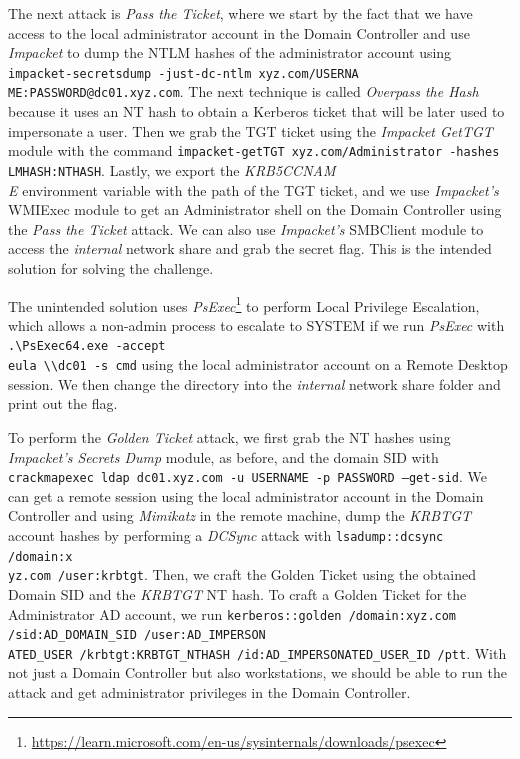 The next attack is \textit{Pass the Ticket}, where we start by the fact that we have access to the local administrator account in the Domain Controller and use \textit{Impacket} to dump the NTLM hashes of the administrator account using \texttt{impacket-secretsdump -just-dc-ntlm xyz.com/USERNA\\ME:PASSWORD@dc01.xyz.com}. The next technique is called \textit{Overpass the Hash} because it uses an NT hash to obtain a Kerberos ticket that will be later used to impersonate a user. Then we grab the TGT ticket using the \textit{Impacket GetTGT} module with the command \texttt{impacket-getTGT xyz.com/Administrator -hashes  LMHASH:NTHASH}. Lastly, we export the \textit{KRB5CCNAM\\E} environment variable with the path of the TGT ticket, and we use \textit{Impacket's} WMIExec module to get an Administrator shell on the Domain Controller using the \textit{Pass the Ticket} attack. We can also use \textit{Impacket's} SMBClient module to access the \textit{internal} network share and grab the secret flag. This is the intended solution for solving the challenge.

The unintended solution uses \textit{PsExec}\footnote{\url{https://learn.microsoft.com/en-us/sysinternals/downloads/psexec}} to perform Local Privilege Escalation, which allows a non-admin process to escalate to SYSTEM if we run \textit{PsExec} with \texttt{.\textbackslash PsExec64.exe -accept\\eula \textbackslash\textbackslash dc01 -s cmd} using the local administrator account on a Remote Desktop session. We then change the directory into the \textit{internal} network share folder and print out the flag.

To perform the \textit{Golden Ticket} attack, we first grab the NT hashes using \textit{Impacket's Secrets Dump} module, as before, and the domain SID with \texttt{crackmapexec ldap dc01.xyz.com -u USERNAME -p PASSWORD ---get-sid}. We can get a remote session using the local administrator account in the Domain Controller and using \textit{Mimikatz} in the remote machine, dump the \textit{KRBTGT} account hashes by performing a \textit{DCSync} attack with \texttt{lsadump::dcsync /domain:x\\yz.com /user:krbtgt}. Then, we craft the Golden Ticket using the obtained Domain SID and the \textit{KRBTGT} NT hash. To craft a Golden Ticket for the Administrator AD account, we run \texttt{kerberos::golden /domain:xyz.com /sid:AD\_DOMAIN\_SID /user:AD\_IMPERSON\\ATED\_USER /krbtgt:KRBTGT\_NTHASH /id:AD\_IMPERSONATED\_USER\_ID /ptt}. With not just a Domain Controller but also workstations, we should be able to run the attack and get administrator privileges in the Domain Controller.

